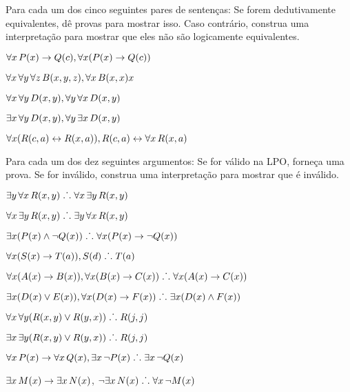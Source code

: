 \solutions
\problempart
\label{pr.FOLequivornot}
Para cada um dos cinco seguintes pares de sentenças: Se forem dedutivamente equivalentes, dê provas para mostrar isso. Caso contrário, construa uma interpretação para mostrar que eles não são logicamente equivalentes.
\begin{earg}
\item $\forall x\,\mathord{P}(x) \rightarrow \mathord{Q}(c), \forall x (\mathord{P}(x) \rightarrow \mathord{Q}(c))$
\item $\forall x\,\forall y\, \forall z\,\mathord{B}(x,y,z), \forall x\,\mathord{B}(x,x)x$
\item $\forall x\,\forall y\,\mathord{D}(x,y), \forall y\,\forall x\,\mathord{D}(x,y)$
\item $\exists x\,\forall y\,\mathord{D}(x,y), \forall y\,\exists x\,\mathord{D}(x,y)$
\item $\forall x (\mathord{R}(c,a) \leftrightarrow \mathord{R}(x,a)), \mathord{R}(c,a) \leftrightarrow \forall x\,\mathord{R}(x,a)$
\end{earg}

\solutions
\problempart
\label{pr.FOLvalidornot}
Para cada um dos dez seguintes argumentos: Se for válido na LPO, forneça uma prova. Se for inválido, construa uma interpretação para mostrar que é inválido.
\begin{earg}
\item $\exists y\,\forall x\,\mathord{R}(x,y) \mathrel{\ldotp\dot{}\,\ldotp} \forall x\,\exists y\,\mathord{R}(x,y)$
\item $\forall x\,\exists y\,\mathord{R}(x,y) \mathrel{\ldotp\dot{}\,\ldotp}  \exists y\,\forall x\,\mathord{R}(x,y)$
\item $\exists x(\mathord{P}(x) \wedge \neg \mathord{Q}(x)) \mathrel{\ldotp\dot{}\,\ldotp} \forall x(\mathord{P}(x) \rightarrow \neg \mathord{Q}(x))$
\item $\forall x(\mathord{S}(x) \rightarrow \mathord{T}(a)), \mathord{S}(d) \mathrel{\ldotp\dot{}\,\ldotp} \mathord{T}(a)$
\item $\forall x(\mathord{A}(x)\rightarrow \mathord{B}(x)), \forall x(\mathord{B}(x) \rightarrow \mathord{C}(x)) \mathrel{\ldotp\dot{}\,\ldotp} \forall x(\mathord{A}(x) \rightarrow \mathord{C}(x))$
\item $\exists x(\mathord{D}(x) \vee \mathord{E}(x)), \forall x(\mathord{D}(x) \rightarrow \mathord{F}(x)) \mathrel{\ldotp\dot{}\,\ldotp} \exists x(\mathord{D}(x) \wedge \mathord{F}(x))$
\item $\forall x\,\forall y(\mathord{R}(x,y) \vee \mathord{R}(y,x)) \mathrel{\ldotp\dot{}\,\ldotp} \mathord{R}(j,j)$
\item $\exists x\,\exists y(\mathord{R}(x,y) \vee \mathord{R}(y,x)) \mathrel{\ldotp\dot{}\,\ldotp} \mathord{R}(j,j)$
\item $\forall x\,\mathord{P}(x) \rightarrow \forall x\,\mathord{Q}(x), \exists x\, \neg\mathord{P}(x) \mathrel{\ldotp\dot{}\,\ldotp} \exists x\, \neg \mathord{Q}(x)$
\item $\exists x\,\mathord{M}(x) \rightarrow \exists x\,\mathord{N}(x)$, $\neg \exists x\,\mathord{N}(x)\mathrel{\ldotp\dot{}\,\ldotp}  \forall x\, \neg \mathord{M}(x)$
\end{earg}

